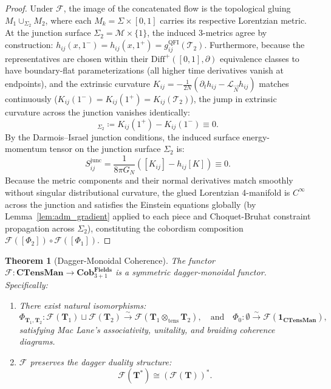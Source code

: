 \documentclass[11pt,a4paper,reqno]{amsart}
\newtheorem{theorem}{Theorem}[section]
\theoremstyle{definition}
\numberwithin{equation}{section}
\newcommand{\CTens}{\mathbf{CTensMan}}
\newcommand{\Cob}{\mathbf{Cob}_{3+1}^{\mathbf{Fields}}}
\newcommand{\QFI}{\mathrm{QFI}}
\begin{document}
\begin{proof}
Under $\mathcal{F}$, the image of the concatenated flow is the topological gluing $M_1 \cup_{\Sigma_2} M_2$, where each $M_k = \Sigma \times [0, 1]$ carries its respective Lorentzian metric. At the junction surface $\Sigma_2 = \mathcal{M} \times \{1\}$, the induced 3-metrics agree by construction: $h_{ij}(x, 1^-) = h_{ij}(x, 1^+) = g^{\QFI}_{ij}(\mathcal{T}_2)$. Furthermore, because the representatives are chosen within their $\mathrm{Diff}^+([0, 1], \partial)$ equivalence classes to have boundary-flat parameterizations (all higher time derivatives vanish at endpoints), and the extrinsic curvature $K_{ij} = -\frac{1}{2N}(\partial_t h_{ij} - \mathcal{L}_{\vec{N}} h_{ij})$ matches continuously ($K_{ij}(1^-) = K_{ij}(1^+) = K_{ij}(\mathcal{T}_2)$), the jump in extrinsic curvature across the junction vanishes identically:
\begin{equation}
    [K_{ij}]_{\Sigma_2} \coloneqq K_{ij}(1^+) - K_{ij}(1^-) \equiv 0.
\end{equation}
By the Darmois--Israel junction conditions, the induced surface energy-momentum tensor on the junction surface $\Sigma_2$ is:
\begin{equation}
    S_{ij}^{\mathrm{junc}} = \frac{1}{8\pi G_N} \left( [K_{ij}] - h_{ij} [K] \right) \equiv 0.
\end{equation}
Because the metric components and their normal derivatives match smoothly without singular distributional curvature, the glued Lorentzian 4-manifold is $C^\infty$ across the junction and satisfies the Einstein equations globally (by Lemma~\ref{lem:adm_gradient} applied to each piece and Choquet-Bruhat constraint propagation across $\Sigma_2$), constituting the cobordism composition $\mathcal{F}([\Phi_2]) \circ \mathcal{F}([\Phi_1])$.
\end{proof}

\begin{theorem}[Dagger-Monoidal Coherence] \label{thm:monoidal}
The functor $\mathcal{F}: \CTens \to \Cob$ is a symmetric dagger-monoidal functor. Specifically:
\begin{enumerate}
    \item There exist natural isomorphisms:
    \begin{equation}
        \Phi_{\mathbf{T}_1, \mathbf{T}_2}: \mathcal{F}(\mathbf{T}_1) \sqcup \mathcal{F}(\mathbf{T}_2) \xrightarrow{\sim} \mathcal{F}(\mathbf{T}_1 \otimes_{\mathrm{tens}} \mathbf{T}_2), \quad \text{and} \quad \Phi_0: \emptyset \xrightarrow{\sim} \mathcal{F}(\mathbf{1}_{\CTens}),
    \end{equation}
    satisfying Mac Lane's associativity, unitality, and braiding coherence diagrams.
    \item $\mathcal{F}$ preserves the dagger duality structure:
    \begin{equation}
        \mathcal{F}(\mathbf{T}^*) \cong (\mathcal{F}(\mathbf{T}))^*.
    \end{equation}
\end{enumerate}
\end{theorem}
\end{document}
